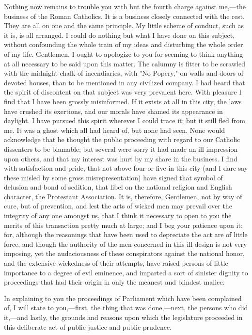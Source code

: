 Nothing now remains to trouble you with but the fourth charge against me,—the business of the Roman Catholics. It is a business closely connected with the rest. They are all on one and the same principle. My little scheme of conduct, such as it is, is all arranged. I could do nothing but what I have done on this subject, without confounding the whole train of my ideas and disturbing the whole order of my life. Gentlemen, I ought to apologize to you for seeming to think anything at all necessary to be said upon this matter. The calumny is fitter to be scrawled with the midnight chalk of incendiaries, with "No Popery," on walls and doors of devoted houses, than to be mentioned in any civilized company. I had heard that the spirit of discontent on that subject was very prevalent here. With pleasure I find that I have been grossly misinformed. If it exists at all in this city, the laws have crushed its exertions, and our morals have shamed its appearance in daylight. I have pursued this spirit wherever I could trace it; but it still fled from me. It was a ghost which all had heard of, but none had seen. None would acknowledge that he thought the public proceeding with regard to our Catholic dissenters to be blamable; but several were sorry it had made an ill impression upon others, and that my interest was hurt by my share in the business. I find with satisfaction and pride, that not above four or five in this city (and I dare say these misled by some gross misrepresentation) have signed that symbol of delusion and bond of sedition, that libel on the national religion and English character, the Protestant Association. It is, therefore, Gentlemen, not by way of cure, but of prevention, and lest the arts of wicked men may prevail over the integrity of any one amongst us, that I think it necessary to open to you the merits of this transaction pretty much at large; and I beg your patience upon it: for, although the reasonings that have been used to depreciate the act are of little force, and though the authority of the men concerned in this ill design is not very imposing, yet the audaciousness of these conspirators against the national honor, and the extensive wickedness of their attempts, have raised persons of little importance to a degree of evil eminence, and imparted a sort of sinister dignity to proceedings that had their origin in only the meanest and blindest malice.

In explaining to you the proceedings of Parliament which have been complained of, I will state to you,—first, the thing that was done,—next, the persons who did it,—and lastly, the grounds and reasons upon which the legislature proceeded in this deliberate act of public justice and public prudence.

